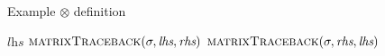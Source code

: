 \documentclass{bmcart}
\newcommand*\NonNegReals{\mathbb{R}_{\geq 0}}
\begin{document}
\begin{backmatter}
	\begin{algorithm}
		\caption{Example $\otimes$ definition}\label{Alg:pairwiseAlignment}
		\begin{algorithmic}[1]
			\Ensure{($\NonNegReals$, $\Sigma_{\Gamma}^{*}$)}
			\newline
			\State \Return $\textit{lhs}$
			\State \Return $\Call{matrixTraceback}{\sigma, \textit{lhs}, \textit{rhs}}$
			\Else
			\State \Return $\Call{matrixTraceback}{\sigma, \textit{rhs}, \textit{lhs}}$
			\EndIf
			\EndFunction
		\end{algorithmic}
	\end{algorithm}
	

\end{backmatter}
\end{document}
